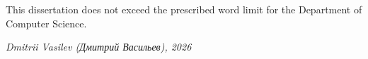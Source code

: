 This dissertation does not exceed the prescribed word limit for the
Department of Computer Science.

\bigskip
\bigskip

\noindent
{}

\bigskip\bigskip

\noindent\textit{Dmitrii Vasilev (Дмитрий Васильев), 2026}
